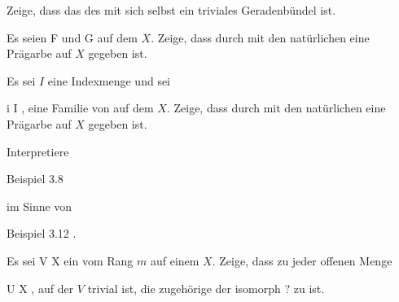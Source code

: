 {}
{





Zeige, dass das
des
mit sich selbst ein triviales Geradenbündel ist.





}
{} {}

{}
{





Es seien
\mathkor {} {{ \mathcal  F   }} {und} {{ \mathcal  G   }} {}
auf dem
$X$. Zeige, dass durch
 mit den natürlichen
eine Prägarbe auf $X$ gegeben ist.





}
{} {}

{}
{





Es sei $I$ eine Indexmenge und sei

 {}
 {i \in I} {}
 {} {} {} {,}
eine Familie von
auf dem
$X$. Zeige, dass durch
 mit den natürlichen
eine Prägarbe auf $X$ gegeben ist.





}
{} {}

{}
{





Interpretiere

Beispiel 3.8

im Sinne von

Beispiel 3.12
.





}
{} {}

{}
{





Es sei
 { V } { X
} {}
ein
vom Rang $m$ auf einem
$X$. Zeige, dass zu jeder offenen Menge

\mavergleichskette
{\vergleichskette
{U
}
{ \subseteq }{ X
}
{  }{
}
{    }{
}
{   }{
}
}
{}{}{,}
auf der $V$ trivial ist, die zugehörige
der
isomorph
 {?} {}
zu
 ist.





}
{} {}

